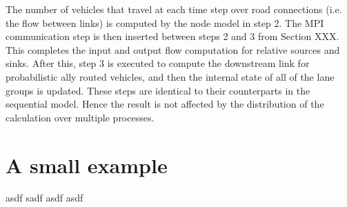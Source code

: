 The number of vehicles that travel at each time step over road connections (i.e. the flow between links) is computed by the node model in step 2. The MPI communication step is then inserted between steps 2 and 3 from Section XXX. This completes the input and output flow computation for relative sources and sinks. After this, step 3 is executed to compute the downstream link for probabilistic ally routed vehicles, and then the internal state of all of the lane groups is updated. These steps are identical to their counterparts in the sequential model. Hence the result is not affected by the distribution of the calculation over multiple processes.

\section{A small example}
asdf sadf asdf asdf 


